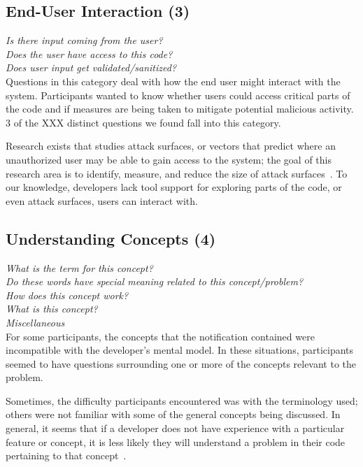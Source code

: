 \documentclass[conference]{IEEEtran}
\begin{document}
\noindent\subsection{\textbf{End-User Interaction (3)}}

\noindent\emph{Is there input coming from the user?} \\
\emph{Does the user have access to this code?} \\
\emph{Does user input get validated/sanitized?} \\

Questions in this category deal with how the end user might interact with the system. Participants wanted to know whether users could access critical parts of the code and if measures are being taken to mitigate potential malicious activity. 3 of the XXX distinct questions we found fall into this category.

Research exists that studies attack surfaces, or vectors that predict where an unauthorized user may be able to gain access to the system; the goal of this research area is to identify, measure, and reduce the size of attack surfaces~\cite{manadhata2011attack, bartel2012automatically}. To our knowledge, developers lack tool support for exploring parts of the code, or even attack surfaces, users can interact with.
 

\noindent\subsection{\textbf{Understanding Concepts (4)}}

\noindent\emph{What is the term for this concept?} \\
\emph{Do these words have special meaning related to this concept/problem?} \\
\emph{How does this concept work?} \\
\emph{What is this concept?} \\
\emph{Miscellaneous} \\

For some participants, the concepts that the notification contained were incompatible with the developer's mental model. In these situations, participants seemed to have questions surrounding one or more of the concepts relevant to the problem.

Sometimes, the difficulty participants encountered was with the terminology used; others were not familiar with some of the general concepts being discussed. In general, it seems that if a developer does not have experience with a particular feature or concept, it is less likely they will understand a problem in their code pertaining to that concept~\cite{}.%
\end{document}
